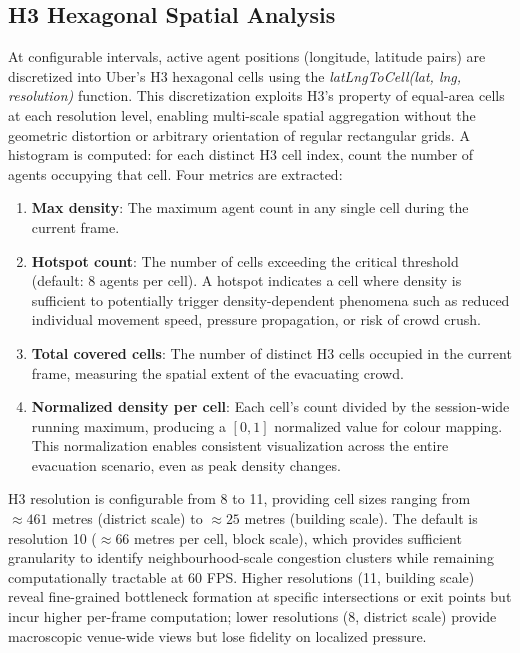 \documentclass[conference]{IEEEtran}
\begin{document}
\subsection{H3 Hexagonal Spatial Analysis}

At configurable intervals, active agent positions (longitude, latitude pairs) are discretized into Uber's H3 hexagonal cells using the \textit{latLngToCell(lat, lng, resolution)} function. This discretization exploits H3's property of equal-area cells at each resolution level, enabling multi-scale spatial aggregation without the geometric distortion or arbitrary orientation of regular rectangular grids. A histogram is computed: for each distinct H3 cell index, count the number of agents occupying that cell. Four metrics are extracted:

\begin{enumerate}
\item \textbf{Max density}: The maximum agent count in any single cell during the current frame.
\item \textbf{Hotspot count}: The number of cells exceeding the critical threshold (default: 8 agents per cell). A hotspot indicates a cell where density is sufficient to potentially trigger density-dependent phenomena such as reduced individual movement speed, pressure propagation, or risk of crowd crush.
\item \textbf{Total covered cells}: The number of distinct H3 cells occupied in the current frame, measuring the spatial extent of the evacuating crowd.
\item \textbf{Normalized density per cell}: Each cell's count divided by the session-wide running maximum, producing a $[0, 1]$ normalized value for colour mapping. This normalization enables consistent visualization across the entire evacuation scenario, even as peak density changes.
\end{enumerate}

H3 resolution is configurable from 8 to 11, providing cell sizes ranging from $\approx 461$ metres (district scale) to $\approx 25$ metres (building scale). The default is resolution 10 ($\approx 66$ metres per cell, block scale), which provides sufficient granularity to identify neighbourhood-scale congestion clusters while remaining computationally tractable at 60 FPS. Higher resolutions (11, building scale) reveal fine-grained bottleneck formation at specific intersections or exit points but incur higher per-frame computation; lower resolutions (8, district scale) provide macroscopic venue-wide views but lose fidelity on localized pressure.
\end{document}

